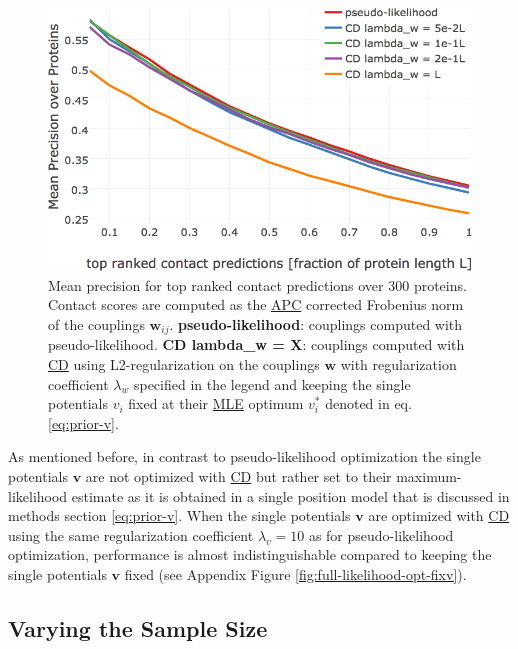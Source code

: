 \documentclass[11pt,a4paper,twoside]{book}
\newcommand{\eq}{\!=\!}
\renewcommand{\v}{\mathbf{v}}
\newcommand{\vi}{v_{i}}
\newcommand{\w}{\mathbf{w}}
\newcommand{\wij}{\mathbf{w}_{ij}}
\theoremstyle{definition}
\theoremstyle{definition}
\theoremstyle{remark}
\begin{document}
\begin{figure}

{\centering \includegraphics[width=0.9\linewidth]{img/full_likelihood/sgd/precision_vs_rank_regularizer} 

}

\caption{Mean precision for top ranked
contact predictions over 300 proteins. Contact scores are computed as
the \protect\hyperlink{abbrev}{APC} corrected Frobenius norm of the
couplings \(\wij\). \textbf{pseudo-likelihood}: couplings computed with
pseudo-likelihood. \textbf{CD lambda\_w = X}: couplings computed with
\protect\hyperlink{abbrev}{CD} using L2-regularization on the couplings
\(\w\) with regularization coefficient \(\lambda_w\) specified in the
legend and keeping the single potentials \(\vi\) fixed at their
\protect\hyperlink{abbrev}{MLE} optimum \(\vi^*\) denoted in eq.
\eqref{eq:prior-v}.}\label{fig:precison-cd-regularization}
\end{figure}

As mentioned before, in contrast to pseudo-likelihood optimization the
single potentials \(\v\) are not optimized with
\protect\hyperlink{abbrev}{CD} but rather set to their
maximum-likelihood estimate as it is obtained in a single position model
that is discussed in methods section \eqref{eq:prior-v}. When the single
potentials \(\v\) are optimized with \protect\hyperlink{abbrev}{CD}
using the same regularization coefficient \(\lambda_v \eq 10\) as for
pseudo-likelihood optimization, performance is almost indistinguishable
compared to keeping the single potentials \(\v\) fixed (see Appendix
Figure \ref{fig:full-likelihood-opt-fixv}).

\subsection{Varying the Sample Size}\label{cd-sampling-size}
\end{document}
